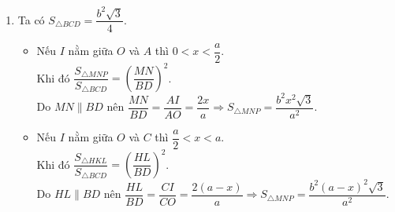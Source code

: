 \begin{ex}
{\begin{enumerate}
\begin{itemize}
			Tương tự $(\alpha)$ cắt $(SAB)$ theo đoạn giao tuyến $M P$ song song với  $SB$ cắt $(SAD)$ theo đoạn giao tuyến $N P\parallel SD$.\\
			Do đó theo  Ta-lét, ta có $ \dfrac{AN}{AB}=\dfrac{AP}{AS}=\dfrac{NP}{SB} \qquad (2).$\\
			 Từ $ (1) $ và $ (2) $, ta có
			$$ \dfrac{AM}{AD} = \dfrac{AP}{AS} \Rightarrow MP  \parallel SD \Rightarrow \dfrac{AM}{AD} =\dfrac{MP}{SD} \qquad (3).$$
			Vậy $ (1) $, $ (2) $ và $ (3) $ suy ra $ \dfrac{MN}{BD}=\dfrac{NP}{SB}=\dfrac{MP}{SD}$,  kết hợp với $ SB=BD=SD $ nên $ \triangle MNP $ là tam giác đều.\\
			Do đó thiết diện là tam giác đều $MNP$ (vì đồng  dạng với tam giác đều $SBD$).\\
			\item Nếu $I $ thuộc đoạn $ OC $ và $ I $ khác $ O $, $ C $ thì thiết diện là tam giác đều $HKL$ có các cạnh  tương ứng song song với cạnh tam giác $SBD$.
		\end{itemize}
		\item Ta có $S_{\triangle  BCD}=\dfrac{b^2 \sqrt{3}}{4}$.
		\begin{itemize}
			\item Nếu $I$ nằm giữa $O$ và  $A$ thì $0<x<\dfrac{a}{2}$.\\
			Khi  đó $\dfrac{S_{\triangle M N P}}{S_{\triangle B C D}}=\left(\dfrac{M N}{BD}\right)^{2}$. \\
			Do $M N \parallel BD$ nên $\dfrac{MN}{BD}=\dfrac{AI}{AO}=\dfrac{2x}{a}\Rightarrow  S_{\triangle MNP}=\dfrac{b^{2} x^{2} \sqrt{3}}{a^{2}}$.
			 \item Nếu $I$ nằm giữa $O$ và $C$ thì $\dfrac{a}{2}<x<a$.\\
			Khi  đó $\dfrac{S_{\triangle HKL}}{S_{\triangle B C D}}=\left(\dfrac{H L}{B D}\right)^{2}$. \\
			Do $H L  \parallel BD$ nên $\dfrac{H L}{B D}=\dfrac{C I}{CO}=\dfrac{2(a-x)}{a} \Rightarrow S_{\triangle M N P}=\dfrac{b^2(a-x)^{2} \sqrt{3}}{a^2}$.
		\end{itemize}
	\end{enumerate}
	} 
\end{ex}

